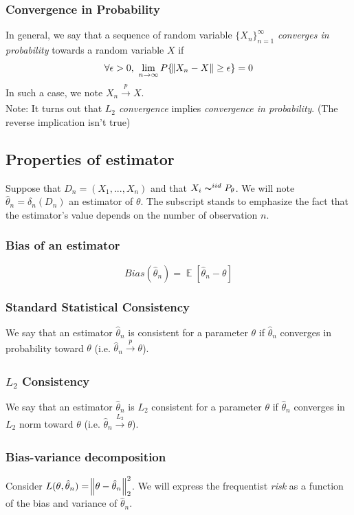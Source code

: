 \documentclass[12pt]{report}
\DeclareMathOperator{\E}{\mathbb{E}}
\begin{document}
\subsubsection{Convergence in Probability}

In general, we say that a sequence of random variable $\{X_n\}_{n=1}^\infty$ \textit{converges in probability} towards a random variable $X$ if 
$$\forall \epsilon>0,\ \lim_{n \to \infty}P\{\norm{X_n-X}\geq \epsilon\}=0$$
In such a case, we note $X_n \xrightarrow[]{p} X$.\\

Note: It turns out that \textit{$L_2$ convergence} implies \textit{convergence in probability}. (The reverse implication isn't true)

\subsection{Properties of estimator}
Suppose that $D_n = (X_1, ..., X_n)$ and that $X_i \thicksim^{iid} P_\theta$. We will note $\hat{\theta}_n=\delta_n(D_n)$ an estimator of $\theta$. The subscript stands to emphasize the fact that the estimator's value depends on the number of observation $n$.

\subsubsection{Bias of an estimator}
$$Bias(\hat{\theta}_n) = \E[\hat{\theta}_n - \theta]$$

\subsubsection{Standard Statistical Consistency}
We say that an estimator $\hat{\theta}_n$ is consistent for a parameter $\theta$ if $\hat{\theta}_n$ converges in probability toward $\theta$ (i.e. $\hat{\theta}_n \xrightarrow[]{p} \theta$).

\subsubsection{$L_2$ Consistency}
We say that an estimator $\hat{\theta}_n$ is $L_2$ consistent for a parameter $\theta$ if $\hat{\theta}_n$ converges in $L_2$ norm toward $\theta$ (i.e. $\hat{\theta}_n \xrightarrow[]{L_2} \theta$).

\subsubsection{Bias-variance decomposition}
Consider $L(\theta,\hat{\theta}_n)=\norm{\theta - \hat{\theta}_n}^2_2$. We will express the frequentist \textit{risk} as a function of the bias and variance of $ \hat{\theta}_n$.\\
\end{document}
